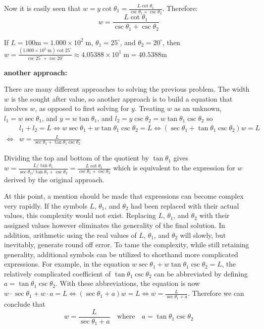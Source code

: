 \documentclass{article}
\begin{document}
Now it is easily seen that \(w = y\cot\theta_1 = \frac{L\cot\theta_1}{\csc\theta_1 + \csc\theta_2}\). Therefore:
\[w = \frac{L\cot\theta_1}{\csc\theta_1 + \csc\theta_2}\]

If \(L = 100\text{m} = 1.000 \times 10^2 \;\text{m}\), \(\theta_1 = 25^\circ\), and \(\theta_2 = 20^\circ\), then \(w = \frac{(1.000 \times 10^2 \;\text{m})\cot 25^\circ}{\csc 25^\circ + \csc 20^\circ} \approx 4.05388 \times 10^1 \;\text{m} = 40.5388\text{m}\)

\vspace{5mm}

\textbf{another approach:}

There are many different approaches to solving the previous problem. The width \(w\) is the sought after value, so another approach is to build a equation that involves \(w\), as opposed to first solving for \(y\). Treating \(w\) as an unknown, \(l_1 = w\sec\theta_1\), and \(y = w\tan\theta_1\), and \(l_2 = y\csc\theta_2 = w\tan\theta_1\csc\theta_2\) so 
\begin{align*}
& l_1 + l_2 = L 
\iff w\sec\theta_1 + w\tan\theta_1\csc\theta_2 = L 
\iff (\sec\theta_1 + \tan\theta_1\csc\theta_2)w = L \\
\iff & w = \frac{L}{\sec\theta_1 + \tan\theta_1\csc\theta_2}
\end{align*} 

Dividing the top and bottom of the quotient by \(\tan\theta_1\) gives \(w = \frac{L/\tan\theta_1}{\sec\theta_1/\tan\theta_1 + \csc\theta_2} = \frac{L\cot\theta_1}{\csc\theta_1 + \csc\theta_2}\) which is equivalent to the expression for \(w\) derived by the original approach.

At this point, a mention should be made that expressions can become complex very rapidly. If the symbols \(L\), \(\theta_1\), and \(\theta_2\) had been replaced with their actual values, this complexity would not exist. Replacing \(L\), \(\theta_1\), and \(\theta_2\) with their assigned values however eliminates the generality of the final solution. In addition, arithmetic using the real values of \(L\), \(\theta_1\), and \(\theta_2\) will slowly, but inevitably, generate round off error. To tame the complexity, while still retaining generality, additional symbols can be utilized to shorthand more complicated expressions. For example, in the equation \(w\sec\theta_1 + w\tan\theta_1\csc\theta_2 = L\), the relatively complicated coefficient of \(\tan\theta_1\csc\theta_2\) can be abbreviated by defining \(a = \tan\theta_1\csc\theta_2\). With these abbreviations, the equation is now \(w \cdot \sec\theta_1 + w \cdot a = L \iff (\sec\theta_1 + a)w = L \iff w = \frac{L}{\sec\theta_1 + a}\). Therefore we can conclude that 
\[w = \frac{L}{\sec\theta_1 + a}  \quad \text{where} \quad a = \tan\theta_1\csc\theta_2\] 
\end{document}
